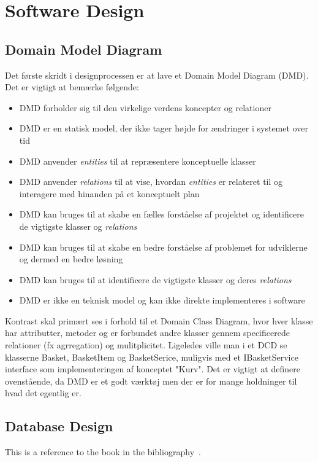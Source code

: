 \chapter{Software Design}
\label{chapter:software-design}

\section{Domain Model Diagram}
Det første skridt i designprocessen er at lave et Domain Model Diagram (DMD). Det er vigtigt at bemærke følgende:
\begin{itemize}
    \item DMD forholder sig til den virkelige verdens koncepter og relationer
    \item DMD er en statisk model, der ikke tager højde for ændringer i systemet over tid
    \item DMD anvender \emph{entities} til at repræsentere konceptuelle klasser
    \item DMD anvender \emph{relations} til at vise, hvordan \emph{entities} er relateret til og interagere med hinanden på et konceptuelt plan
    \item DMD kan bruges til at skabe en fælles forståelse af projektet og identificere de vigtigste klasser og \emph{relations}
    \item DMD kan bruges til at skabe en bedre forståelse af problemet for udviklerne og dermed en bedre løsning
    \item DMD kan bruges til at identificere de vigtigste klasser og deres \emph{relations}
    \item DMD er ikke en teknisk model og kan ikke direkte implementeres i software
\end{itemize} 
Kontrast skal primært ses i forhold til et Domain Class Diagram, hvor hver klasse har attributter, metoder og er forbundet andre klasser gennem specificerede relationer (fx agrregation) og mulitplicitet. 
Ligeledes ville man i et DCD se klasserne Basket, BasketItem og BasketSerice, muligvis med et IBasketService interface som implementeringen af konceptet "Kurv".
Det er vigtigt at definere ovenstående, da DMD er et godt værktøj men der er for mange holdninger til hvad det egentlig er.

\section{Database Design}
This is a reference to the book in the bibliography~\cite{connolly2023database}.


